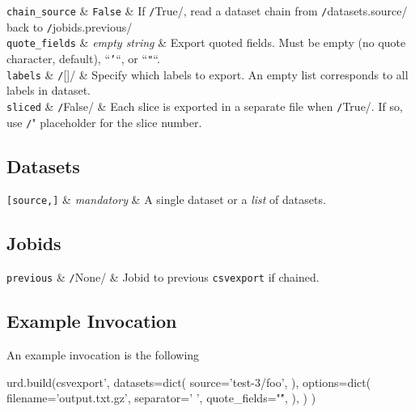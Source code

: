   \RP \texttt{chain\_source} & \texttt{False} & If
  \texttt/True/, read a dataset chain from
  \texttt/datasets.source/ back to
  \texttt/jobids.previous/\\[1ex]

  \RP \texttt{quote\_fields} & \textsl{empty string} & Export quoted fields.  Must be empty
  (no quote character, default), ``\texttt{'}``, or ``\texttt{"}``.\\[1ex]
  
  \RP \texttt{labels} & \texttt/[]/ & Specify which labels to
  export.  An empty list corresponds to all labels in dataset.\\[1ex]
  
  \RP \texttt{sliced} & \texttt/False/ & Each slice is
  exported in a separate file when \texttt/True/.  If so,
  use \texttt/"%
  placeholder for the slice number.\\[1ex]
\stoptable

\subsection*{Datasets}
\starttable
  \RP \texttt{[source,]} & \textsl{mandatory} & A single
  dataset or a \textsl{list} of datasets.\\[1ex]
\stoptable


\subsection*{Jobids}
\starttable
  \texttt{previous} & \texttt/None/ & Jobid to
  previous \texttt{csvexport} if chained.\\[1ex]
\stoptable




\subsection{Example Invocation}
An example invocation is the following

\begin{python}
urd.build(csvexport',
    datasets=dict(
        source='test-3/foo',
    ),
    options=dict(
        filename='output.txt.gz',
        separator=' ',
        quote_fields="\'",
        ),
    )
)
\end{python}












